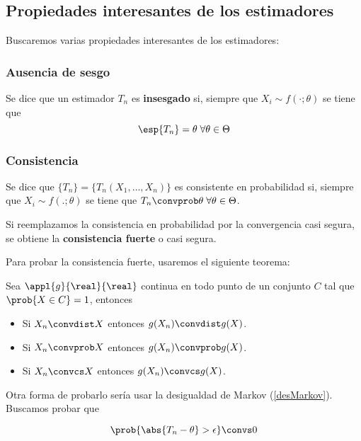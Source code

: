 \documentclass{apuntes}
\begin{document}
\newpage
\subsection{Propiedades interesantes de los estimadores}
Buscaremos varias propiedades interesantes de los estimadores:

\subsubsection{Ausencia de sesgo} Se dice que un estimador $T_n$ es \textbf{insesgado}  si, siempre que $X_i \sim f(\cdot;\theta)$ se tiene que \[\esp{T_n} = \theta\; \forall \theta \in \Theta \]

\subsubsection{Consistencia} Se dice que $\{T_n\} = \{ T_n(X_1, \dotsc, X_n) \}$ es consistente en probabilidad si, siempre que $X_i \sim f(.;\theta)$ se tiene que $T_n \convprob \theta \; \forall \theta \in \Theta$.

Si reemplazamos la consistencia en probabilidad por la convergencia casi segura, se obtiene la \textbf{consistencia fuerte} o casi segura. 

Para probar la consistencia fuerte, usaremos el siguiente teorema:

\begin{theorem} \label{thmApContinua} Sea $\appl{g}{\real}{\real}$ continua en todo punto de un conjunto $C$ tal que $\prob{X\in C} = 1$, entonces

\begin{itemize}
\item Si $X_n\convdist X$ entonces $g(X_n)\convdist  g(X)$.
\item Si $X_n\convprob X$ entonces $g(X_n)\convprob g(X)$.
\item Si $X_n\convcs X$ entonces $g(X_n)\convcs g(X)$.
\end{itemize}

\end{theorem}

Otra forma de probarlo sería usar la desigualdad de Markov (\ref{desMarkov}). Buscamos probar que

\[ \prob{\abs{T_n - \theta} > \epsilon} \convs 0 \]
\end{document}
